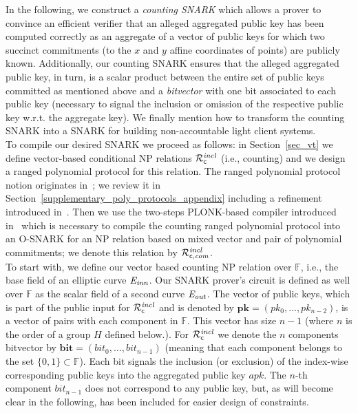In the following, we construct a \emph{counting SNARK} which allows a prover to convince an efficient verifier that an alleged 
aggregated public key has been computed correctly as an aggregate of a vector of public keys for which 
two succinct commitments (to the $x$ and $y$ affine coordinates of points) are publicly known. Additionally, our counting 
SNARK ensures that the alleged aggregated public key, in turn, is a scalar product between the entire set of public keys 
committed as mentioned above and a \emph{bitvector} with one bit associated to each public key 
(necessary to signal the inclusion or omission of the respective public key w.r.t. the aggregate key).  
We finally mention how to transform the counting SNARK into a SNARK for building non-accountable light client systems. \\

\noindent To compile our desired SNARK we proceed as follows: in 
Section~\ref{sec_vt} we define vector-based conditional NP relations $\mathcal{R}^{\mathit{incl}}_{\mathsf{c}}$ (i.e., counting) and we design a 
ranged polynomial protocol for this relation. The ranged polynomial protocol notion originates in~\cite{plonk}; 
we review it in Section~\ref{supplementary_poly_protocols_appendix} including a refinement introduced in~\cite{LC_paper}.  
Then we use the two-steps PLONK-based compiler introduced in~\cite{LC_paper} which is necessary to compile the counting 
ranged polynomial protocol into an O-SNARK for an NP relation based on mixed vector and pair of polynomial commitments; 
we denote this relation by $\mathcal{R}^{\mathit{incl}}_{\mathsf{c},\mathit{com}}$. \\

\noindent To start with, we define our vector based counting NP relation over $\mathbb{F}$, i.e., the base field of an elliptic curve $\mathit{E}_{\mathit{inn}}$. 
Our SNARK prover's circuit is defined as well over $\mathbb{F}$ as the scalar field of a second curve $\mathit{E}_{\mathit{out}}$. 
The vector of public keys, which is part of the public input for $\mathcal{R}^{\mathit{incl}}_{\mathsf{c}}$ and is denoted by 
$\mathbf{pk} = (\mathit{pk_0}, \ldots, \mathit{pk_{n-2}})$, is a vector of pairs with each component in $\mathbb{F}$. 
This vector has size $n-1$ (where $n$ is the order of a group $H$ defined below.). For $\mathcal{R}^{\mathit{incl}}_{\mathsf{c}}$ we denote 
the $n$ components bitvector by $\mathbf{bit} = (\mathit{bit_0}, \ldots, \mathit{bit_{n-1}})$ 
(meaning that each component belongs to the set $\{0,1\} \subset \mathbb{F}$). 
Each bit signals the inclusion (or exclusion) of the index-wise corresponding public keys 
into the aggregated public key $\mathit{apk}$. The $n$-th component $\mathit{bit_{n-1}}$ does not correspond to any public key, 
but, as will become clear in the following, has been included for easier design of constraints. \\ 

